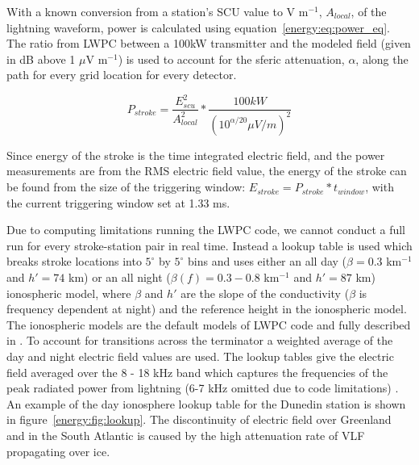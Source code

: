 With a known conversion from a station's SCU value to V m$^{-1}$, $A_{local}$, of the lightning waveform, power is calculated using equation~\ref{energy:eq:power_eq}.
The ratio from LWPC between a 100kW transmitter and the modeled field (given in dB above 1 $\mu$V m$^{-1}$) is used to account for the sferic attenuation, $\alpha$, along the path for every grid location for every detector.

\begin{equation}
P_{stroke}=\frac{E_{scu}^2}{A_{local}^2} * \frac{100kW}{(10^{\alpha/20}\mu V/m)^2}
\label{energy:eq:power_eq}
\end{equation}

Since energy of the stroke is the time integrated electric field, and the power measurements are from the RMS electric field value, the energy of the stroke can be found from the size of the triggering window: $E_{stroke}=P_{stroke} * t_{window}$, with the current triggering window set at 1.33 ms.

Due to computing limitations running the LWPC code, we cannot conduct a full run for every stroke-station pair in real time.
Instead a lookup table is used which breaks stroke locations into $5^{\circ}$ by $5^{\circ}$ bins and uses either an all day ($\beta=0.3$ km$^{-1}$ and $h'=74$ km) or an all night ($\beta(f)=0.3-0.8$ km$^{-1}$ and $h'=87$ km) ionospheric model, where $\beta$ and $h'$ are the slope of the conductivity ($\beta$ is frequency dependent at night) and the reference height in the ionospheric model.
The ionospheric models are the default models of LWPC code and fully described in \citet{Ferguson1998}. 
To account for transitions across the terminator a weighted average of the day and night electric field values are used.
The lookup tables give the electric field averaged over the 8 - 18 kHz band which captures the frequencies of the peak radiated power from lightning (6-7 kHz omitted due to code limitations) \citep{Volland1995}.
An example of the day ionosphere lookup table for the Dunedin station is shown in figure~\ref{energy:fig:lookup}.
The discontinuity of electric field over Greenland and in the South Atlantic is caused by the high attenuation rate of VLF propagating over ice.

